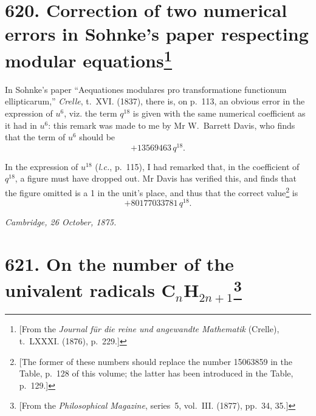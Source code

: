 \documentclass[11pt,a4paper]{article}
\theoremstyle{plain}
\theoremstyle{definition}
\theoremstyle{remark}
\begin{document}
\newpage
\section[Correction of two numerical errors in Sohnke's paper respecting modular equations]{\textbf{620.} Correction of two numerical errors in Sohnke's paper respecting modular equations\footnote{[From the \textit{Journal f\"{u}r die reine und angewandte Mathematik} (Crelle), t.~LXXXI. (1876), p.~229.]}}

In Sohnke's paper ``Aequationes modulares pro transformatione functionum ellipticarum,'' \textit{Crelle}, t.~XVI. (1837), there is, on p.~113, an obvious error in the expression of $u^6$, viz. the term $q^{18}$ is given with the same numerical coefficient as it had in $u^6$: this remark was made to me by Mr W.~Barrett Davis, who finds that the term of $u^6$ should be
\[
+ 13569463\, q^{18}.
\]

In the expression of $u^{18}$ (\textit{l.c.}, p.~115), I had remarked that, in the coefficient of $q^{18}$, a figure must have dropped out. Mr Davis has verified this, and finds that the figure omitted is a 1 in the unit's place, and thus that the correct value\footnote{[The former of these numbers should replace the number 15063859 in the Table, p.~128 of this volume; the latter has been introduced in the Table, p.~129.]} is
\[
+ 80177033781\, q^{18}.
\]

\begin{flushright}
\textit{Cambridge, 26 October, 1875.}
\end{flushright}

\newpage
\section[On the number of the univalent radicals $\mathrm{C}_n\mathrm{H}_{2n+1}$]{\textbf{621.} On the number of the univalent radicals C$_n$H$_{2n+1}$\footnote{[From the \textit{Philosophical Magazine}, series~5, vol.~III. (1877), pp.~34, 35.]}}
\end{document}
